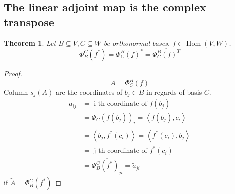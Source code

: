 \documentclass{article}
\newtheorem{theorem}{Theorem}  \numberwithin{theorem}{section}
\newcommand{\ip}[2]{\left\langle#1,#2\right\rangle} %
\begin{document}
\subsection{The linear adjoint map is the complex transpose}
\begin{theorem} %
  Let $B \subseteq V, C \subseteq W$ be orthonormal bases. $f \in \operatorname{Hom}(V, W)$.
  \[ \Phi_B^C(f^*) = \Phi_C^B(f)^* = \overline{\Phi_C^B(f)^T} \]
\end{theorem}

\begin{proof}
  \[ A = \Phi_C^B(f) \]
  Column $s_j(A)$ are the coordinates of $b_j \in B$ in regards of basis $C$.
  \begin{align*}
    a_{ij} &= \text{ i-th coordinate of } f(b_j) \\
      &= \Phi_C(f(b_j))_i = \ip{f(b_j)}{c_i} \\
      &= \ip{b_j}{f^*(c_i)} = \overline{\ip{f^*(c_i)}{b_j}} \\
      &= \text{ j-th coordinate of } f^*(c_i) \\
      &= \overline{\Phi_B^C(f^*)_{ji}} = \overline{\tilde{a}_{ji}}
  \end{align*}
  if $\tilde A = \Phi_B^C(f^*)$
\end{proof}
\end{document}
